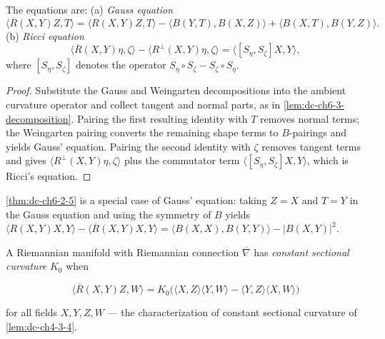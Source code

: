 \begin{proposition}
  \label{prop:dc-ch6-3-1}


  The equations are:
  (a) \emph{Gauss equation}
  $$
  \langle\overline{R}(X,Y)Z,T\rangle=\langle R(X,Y)Z,T\rangle-\langle B(Y,T),B(X,Z)\rangle+\langle B(X,T),B(Y,Z)\rangle.
  $$
  (b) \emph{Ricci equation}
  $$
  \langle\overline{R}(X,Y)\eta,\zeta\rangle-\langle R^\perp(X,Y)\eta,\zeta\rangle=\langle[S_\eta,S_\zeta]X,Y\rangle,
  $$
  where $[S_\eta,S_\zeta]$ denotes the operator $S_\eta\circ S_\zeta-S_\zeta\circ S_\eta$.
\end{proposition}
\begin{proof}

  \sketch
  Substitute the Gauss and Weingarten decompositions into the ambient curvature
  operator and collect tangent and normal parts, as in
  \cref{lem:dc-ch6-3-decomposition}. Pairing the first resulting identity with
  $T$ removes normal terms; the Weingarten pairing converts the remaining shape
  terms to $B$-pairings and yields Gauss' equation. Pairing the second identity
  with $\zeta$ removes tangent terms and gives
  $\langle R^\perp(X,Y)\eta,\zeta\rangle$ plus the commutator term
  $\langle[S_\eta,S_\zeta]X,Y\rangle$, which is Ricci's equation.
\end{proof}

\begin{remark}
  \label{rem:dc-ch6-3-2}


  \cref{thm:dc-ch6-2-5} is a special case of Gauss' equation:
  taking $Z=X$ and $T=Y$ in the Gauss equation and using the symmetry of $B$
  yields $\langle R(X,Y)X,Y\rangle-\langle\overline{R}(X,Y)X,Y\rangle
  =\langle B(X,X),B(Y,Y)\rangle-|B(X,Y)|^2$.
\end{remark}

\begin{definition}
  \label{def:dc-ch6-3-constant-curvature}


  A Riemannian manifold with Riemannian connection $\overline{\nabla}$ has
  \emph{constant sectional curvature} $K_0$ when

  $$
  \langle\overline{R}(X,Y)Z,W\rangle=K_0\big(\langle X,Z\rangle\langle Y,W\rangle-\langle Y,Z\rangle\langle X,W\rangle\big)
  $$

  for all fields $X,Y,Z,W$ — the characterization of constant sectional
  curvature of \cref{lem:dc-ch4-3-4}.
\end{definition}

